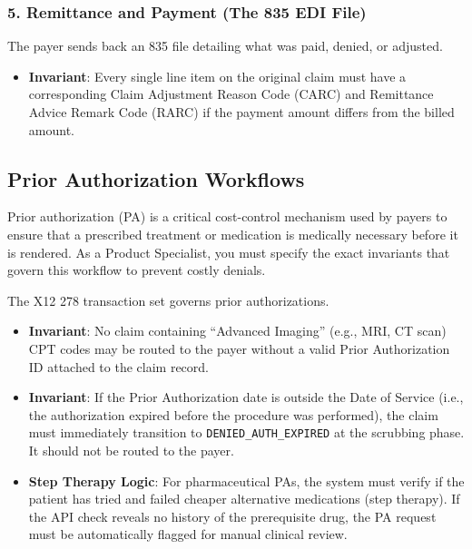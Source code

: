 \subsubsection{5. Remittance and Payment (The 835 EDI
File)}\label{remittance-and-payment-the-835-edi-file}

The payer sends back an 835 file detailing what was paid, denied, or
adjusted.

\begin{itemize}
\tightlist
\item
  \textbf{Invariant}: Every single line item on the original claim must
  have a corresponding Claim Adjustment Reason Code (CARC) and
  Remittance Advice Remark Code (RARC) if the payment amount differs
  from the billed amount.
\end{itemize}

\subsection{Prior Authorization
Workflows}\label{prior-authorization-workflows}

Prior authorization (PA) is a critical cost-control mechanism used by
payers to ensure that a prescribed treatment or medication is medically
necessary before it is rendered. As a Product Specialist, you must
specify the exact invariants that govern this workflow to prevent costly
denials.

The X12 278 transaction set governs prior authorizations.

\begin{itemize}
\tightlist
\item
  \textbf{Invariant}: No claim containing ``Advanced Imaging'' (e.g.,
  MRI, CT scan) CPT codes may be routed to the payer without a valid
  Prior Authorization ID attached to the claim record.
\item
  \textbf{Invariant}: If the Prior Authorization date is outside the
  Date of Service (i.e., the authorization expired before the procedure
  was performed), the claim must immediately transition to
  \texttt{DENIED\_AUTH\_EXPIRED} at the scrubbing phase. It should not
  be routed to the payer.
\item
  \textbf{Step Therapy Logic}: For pharmaceutical PAs, the system must
  verify if the patient has tried and failed cheaper alternative
  medications (step therapy). If the API check reveals no history of the
  prerequisite drug, the PA request must be automatically flagged for
  manual clinical review.
\end{itemize}

